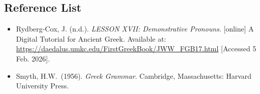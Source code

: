 \documentclass[10pt,a4paper,notitlepage]{article}
\begin{document}
    \subsection*{Reference List}
    \begin{itemize}[label={}, leftmargin=0]
        \item Rydberg-Cox, J. (n.d.). \textit{LESSON XVII: Demonstrative Pronouns}. [online] A Digital Tutorial for Ancient Greek. Available at: \url{https://daedalus.umkc.edu/FirstGreekBook/JWW_FGB17.html} [Accessed 5 Feb. 2026].
        \item Smyth, H.W.\ (1956). \textit{Greek Grammar}. Cambridge, Massachusetts: Harvard University Press.
    \end{itemize}
\end{document}
